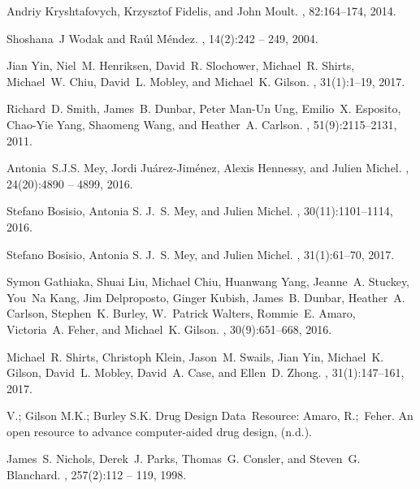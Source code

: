 \documentclass{svjour3}                     %
\begin{document}
\begin{thebibliography}{10}
Andriy Kryshtafovych, Krzysztof Fidelis, and John Moult.
, 82:164--174,
  2014.

Shoshana~J Wodak and Raúl Méndez.
, 14(2):242 -- 249, 2004.

Jian Yin, Niel~M. Henriksen, David~R. Slochower, Michael~R. Shirts, Michael~W.
  Chiu, David~L. Mobley, and Michael~K. Gilson.
, 31(1):1--19, 2017.

Richard~D. Smith, James~B. Dunbar, Peter Man-Un Ung, Emilio~X. Esposito,
  Chao-Yie Yang, Shaomeng Wang, and Heather~A. Carlson.
, 51(9):2115--2131,
  2011.

Antonia~S.J.S. Mey, Jordi Juárez-Jiménez, Alexis Hennessy, and Julien Michel.
, 24(20):4890 -- 4899, 2016.

Stefano Bosisio, Antonia S. J.~S. Mey, and Julien Michel.
, 30(11):1101--1114,
  2016.

Stefano Bosisio, Antonia S. J.~S. Mey, and Julien Michel.
, 31(1):61--70, 2017.

Symon Gathiaka, Shuai Liu, Michael Chiu, Huanwang Yang, Jeanne~A. Stuckey,
  You~Na Kang, Jim Delproposto, Ginger Kubish, James~B. Dunbar, Heather~A.
  Carlson, Stephen~K. Burley, W.~Patrick Walters, Rommie~E. Amaro, Victoria~A.
  Feher, and Michael~K. Gilson.
, 30(9):651--668, 2016.

Michael~R. Shirts, Christoph Klein, Jason~M. Swails, Jian Yin, Michael~K.
  Gilson, David~L. Mobley, David~A. Case, and Ellen~D. Zhong.
, 31(1):147--161,
  2017.

V.; Gilson M.K.; Burley S.K. Drug Design Data~Resource: Amaro, R.;~Feher.
\newblock An open resource to advance computer-aided drug design, (n.d.).

James~S. Nichols, Derek~J. Parks, Thomas~G. Consler, and Steven~G. Blanchard.
, 257(2):112 -- 119, 1998.


\end{thebibliography}
\end{document}
